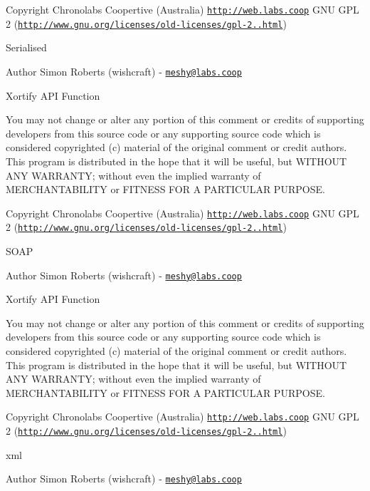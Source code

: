 \begin{DoxyCopyright}{Copyright}
Chronolabs Coopertive (Australia) \href{http://web.labs.coop}{\tt http\-://web.\-labs.\-coop}  G\-N\-U G\-P\-L 2 (\href{http://www.gnu.org/licenses/old-licenses/gpl-2.0.html}{\tt http\-://www.\-gnu.\-org/licenses/old-\/licenses/gpl-\/2..\-html})
\end{DoxyCopyright}
Serialised \begin{DoxyAuthor}{Author}
Simon Roberts (wishcraft) -\/ \href{mailto:meshy@labs.coop}{\tt meshy@labs.\-coop}
\end{DoxyAuthor}
Xortify A\-P\-I Function

You may not change or alter any portion of this comment or credits of supporting developers from this source code or any supporting source code which is considered copyrighted (c) material of the original comment or credit authors. This program is distributed in the hope that it will be useful, but W\-I\-T\-H\-O\-U\-T A\-N\-Y W\-A\-R\-R\-A\-N\-T\-Y; without even the implied warranty of M\-E\-R\-C\-H\-A\-N\-T\-A\-B\-I\-L\-I\-T\-Y or F\-I\-T\-N\-E\-S\-S F\-O\-R A P\-A\-R\-T\-I\-C\-U\-L\-A\-R P\-U\-R\-P\-O\-S\-E.

\begin{DoxyCopyright}{Copyright}
Chronolabs Coopertive (Australia) \href{http://web.labs.coop}{\tt http\-://web.\-labs.\-coop}  G\-N\-U G\-P\-L 2 (\href{http://www.gnu.org/licenses/old-licenses/gpl-2.0.html}{\tt http\-://www.\-gnu.\-org/licenses/old-\/licenses/gpl-\/2..\-html})
\end{DoxyCopyright}
S\-O\-A\-P \begin{DoxyAuthor}{Author}
Simon Roberts (wishcraft) -\/ \href{mailto:meshy@labs.coop}{\tt meshy@labs.\-coop}
\end{DoxyAuthor}
Xortify A\-P\-I Function

You may not change or alter any portion of this comment or credits of supporting developers from this source code or any supporting source code which is considered copyrighted (c) material of the original comment or credit authors. This program is distributed in the hope that it will be useful, but W\-I\-T\-H\-O\-U\-T A\-N\-Y W\-A\-R\-R\-A\-N\-T\-Y; without even the implied warranty of M\-E\-R\-C\-H\-A\-N\-T\-A\-B\-I\-L\-I\-T\-Y or F\-I\-T\-N\-E\-S\-S F\-O\-R A P\-A\-R\-T\-I\-C\-U\-L\-A\-R P\-U\-R\-P\-O\-S\-E.

\begin{DoxyCopyright}{Copyright}
Chronolabs Coopertive (Australia) \href{http://web.labs.coop}{\tt http\-://web.\-labs.\-coop}  G\-N\-U G\-P\-L 2 (\href{http://www.gnu.org/licenses/old-licenses/gpl-2.0.html}{\tt http\-://www.\-gnu.\-org/licenses/old-\/licenses/gpl-\/2..\-html})
\end{DoxyCopyright}
xml \begin{DoxyAuthor}{Author}
Simon Roberts (wishcraft) -\/ \href{mailto:meshy@labs.coop}{\tt meshy@labs.\-coop} 
\end{DoxyAuthor}
